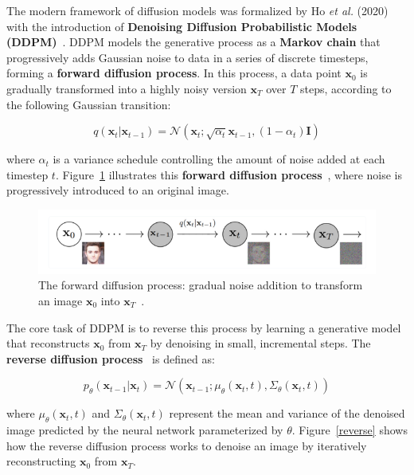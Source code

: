 \documentclass[12pt,DIV14,BCOR12mm,a4paper,footinclude=false,headinclude,parskip=half-,twoside,openright,cleardoublepage=empty,toc=index,bibliography=totoc,listof=totoc]{scrreprt}
\numberwithin{equation}{chapter}
\begin{document}
The modern framework of diffusion models was formalized by Ho \textit{et al.} (2020) with the introduction of \textbf{Denoising Diffusion Probabilistic Models (DDPM)}~\cite{diffusion2}. DDPM models the generative process as a \textbf{Markov chain} that progressively adds Gaussian noise to data in a series of discrete timesteps, forming a \textbf{forward diffusion process}. In this process, a data point \(\mathbf{x}_0\) is gradually transformed into a highly noisy version \(\mathbf{x}_T\) over \(T\) steps, according to the following Gaussian transition:

\begin{equation}
q(\mathbf{x}_t | \mathbf{x}_{t-1}) = \mathcal{N}(\mathbf{x}_t; \sqrt{\alpha_t} \mathbf{x}_{t-1}, (1 - \alpha_t)\mathbf{I})
\end{equation}

where \(\alpha_t\) is a variance schedule controlling the amount of noise added at each timestep \(t\). Figure~\ref{forward} illustrates this \textbf{forward diffusion process}~\cite{weng2021diffusion, diffusion2}, where noise is progressively introduced to an original image.

\begin{figure}
	\centering
	\includegraphics[scale=.9]{../media/diffusion_forward_process.png}
	\caption{The forward diffusion process: gradual noise addition to transform an image \(\mathbf{x}_0\) into \(\mathbf{x}_T\)~\cite{yainnoware2022}.}
	\label{forward}
\end{figure}

The core task of DDPM is to reverse this process by learning a generative model that reconstructs \(\mathbf{x}_0\) from \(\mathbf{x}_T\) by denoising in small, incremental steps. The \textbf{reverse diffusion process}~\cite{weng2021diffusion, diffusion2} is defined as:

\begin{equation}
p_\theta(\mathbf{x}_{t-1} | \mathbf{x}_t) = \mathcal{N}(\mathbf{x}_{t-1}; \mu_\theta(\mathbf{x}_t, t), \Sigma_\theta(\mathbf{x}_t, t))
\end{equation}

where \(\mu_\theta(\mathbf{x}_t, t)\) and \(\Sigma_\theta(\mathbf{x}_t, t)\) represent the mean and variance of the denoised image predicted by the neural network parameterized by \(\theta\). Figure~\ref{reverse} shows how the reverse diffusion process works to denoise an image by iteratively reconstructing \(\mathbf{x}_0\) from \(\mathbf{x}_T\).
\end{document}
